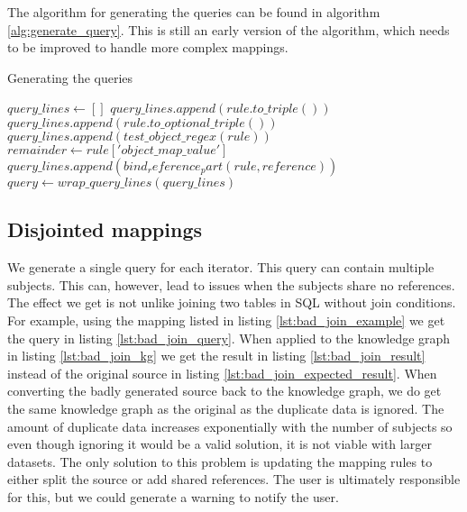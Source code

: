 The algorithm for generating the queries can be found in algorithm \ref{alg:generate_query}. This is still an early version of the algorithm, which needs to be improved to handle more complex mappings.

\begin{algorithm} 
    \caption{Generating the queries}
    \label{alg:generate_query}
    \begin{algorithmic}[1]
        \State $query\_lines \gets []$
                \State $query\_lines.append(rule.to\_triple())$ 
                \State $query\_lines.append(rule.to\_optional\_triple())$
                \State $query\_lines.append(test\_object\_regex(rule))$
                \State $remainder \gets rule['object\_map\_value']$
                    \State $query\_lines.append(bind_reference_part(rule, reference))$
                \EndFor
            \EndIf
        \EndFor
        \State $query \gets wrap\_query\_lines(query\_lines)$
    \end{algorithmic}
\end{algorithm}

\subsection{Disjointed mappings}

We generate a single query for each iterator. This query can contain multiple subjects. This can, however, lead to issues when the subjects share no references. The effect we get is not unlike joining two tables in SQL without join conditions. For example, using the mapping listed in listing \ref{lst:bad_join_example} we get the query in listing \ref{lst:bad_join_query}. When applied to the knowledge graph in listing \ref{lst:bad_join_kg} we get the result in listing \ref{lst:bad_join_result} instead of the original source in listing \ref{lst:bad_join_expected_result}. When converting the badly generated source back to the knowledge graph, we do get the same knowledge graph as the original as the duplicate data is ignored. The amount of duplicate data increases exponentially with the number of subjects so even though ignoring it would be a valid solution, it is not viable with larger datasets. The only solution to this problem is updating the mapping rules to either split the source or add shared references. The user is ultimately responsible for this, but we could generate a warning to notify the user. 

